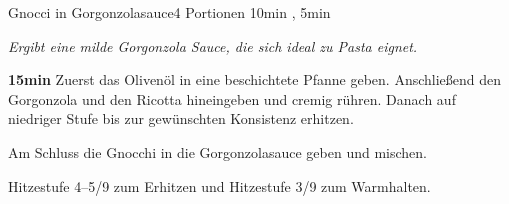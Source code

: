 \documentclass[../recipe-collections/cooking.tex]{subfiles}
\begin{document}
\begin{recipe}{Gnocci in Gorgonzolasauce}{4 Portionen }{10min , 5min }

  \freeform{}\textit{Ergibt eine milde Gorgonzola Sauce, die sich ideal zu Pasta eignet.}


  \textbf{15min}
  Zuerst das Olivenöl in eine beschichtete Pfanne geben.
  Anschließend den Gorgonzola und den Ricotta hineingeben und cremig rühren.
  Danach auf niedriger Stufe bis zur gewünschten Konsistenz erhitzen.


  Am Schluss die Gnocchi in die Gorgonzolasauce geben und mischen.

  \freeform{}\hrulefill{}

  \freeform{}
  Hitzestufe 4–5/9 zum Erhitzen und Hitzestufe 3/9 zum Warmhalten.

\end{recipe}
\end{document}
